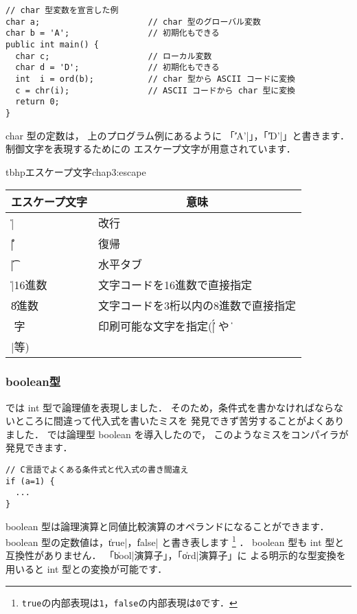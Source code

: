 \begin{mylist}
\begin{verbatim}
// char 型変数を宣言した例
char a;                      // char 型のグローバル変数
char b = 'A';                // 初期化もできる
public int main() {
  char c;                    // ローカル変数
  char d = 'D';              // 初期化もできる
  int  i = ord(b);           // char 型から ASCII コードに変換
  c = chr(i);                // ASCII コードから char 型に変換
  return 0;
}
\end{verbatim}
\end{mylist}

char 型の定数は，
上のプログラム例にあるように 「\|'A'|」，「\|'D'|」と書きます．
制御文字を表現するためにの
エスケープ文字が用意されています．

\begin{mytable}{tbhp}{エスケープ文字}{chap3:escape}
\begin{tabular}{ll}
\hline
\multicolumn{1}{c}{エスケープ文字} & \multicolumn{1}{c}{意味} \\
\hline
\|\n| & 改行 \\
\|\r| & 復帰 \\
\|\t| & 水平タブ \\
\|\x|16進数 & 文字コードを16進数で直接指定 \\
\|\|8進数 & 文字コードを3桁以内の8進数で直接指定 \\
\|\|文字 & 印刷可能な文字を指定(\|\'| や \|\\|等) \\
\hline
\end{tabular}
\end{mytable}

\subsubsection{boolean型}

\cl では int 型で論理値を表現しました．
そのため，条件式を書かなければならないところに間違って代入式を書いたミスを
発見できず苦労することがよくありました．
\cmml では論理型 boolean を導入したので，
このようなミスをコンパイラが発見できます．

\begin{mylist}
\begin{verbatim}
// C言語でよくある条件式と代入式の書き間違え
if (a=1) {
  ...
}
\end{verbatim}
\end{mylist}

boolean 型は論理演算と同値比較演算のオペランドになることができます．
boolean 型の定数値は，\|true|，\|false| と書き表します
\footnote{{\tt true}の内部表現は{\tt 1}，{\tt false}の内部表現は{\tt 0}です．}
．
boolean 型も int 型と互換性がありません．
「\|bool|演算子」，「\|ord|演算子」に
よる明示的な型変換を用いると int 型との変換が可能です．

